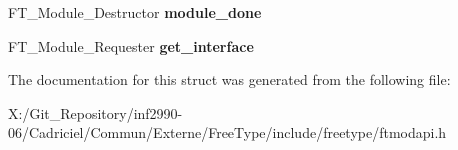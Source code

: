\begin{DoxyCompactItemize}
\item 
\hypertarget{struct_f_t___module___class___ab6e9c780519e24a51144df79692cf339}{F\-T\-\_\-\-Module\-\_\-\-Destructor {\bfseries module\-\_\-done}}\label{struct_f_t___module___class___ab6e9c780519e24a51144df79692cf339}

\item 
\hypertarget{struct_f_t___module___class___aa72d79fcd0991231e24e88f359244e8e}{F\-T\-\_\-\-Module\-\_\-\-Requester {\bfseries get\-\_\-interface}}\label{struct_f_t___module___class___aa72d79fcd0991231e24e88f359244e8e}

\end{DoxyCompactItemize}


The documentation for this struct was generated from the following file\-:\begin{DoxyCompactItemize}
\item 
X\-:/\-Git\-\_\-\-Repository/inf2990-\/06/\-Cadriciel/\-Commun/\-Externe/\-Free\-Type/include/freetype/ftmodapi.\-h\end{DoxyCompactItemize}
